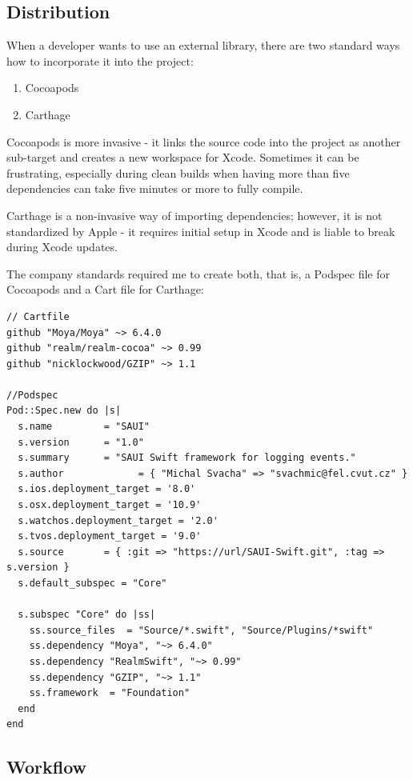 \subsection{Distribution}

When a developer wants to use an external library, there are two standard ways how to incorporate it into the project:

\begin{enumerate}
	\item Cocoapods
	\item Carthage
\end{enumerate}

Cocoapods is more invasive - it links the source code into the project as another sub-target and creates a new workspace for Xcode. Sometimes it can be frustrating, especially during clean builds when having more than five dependencies can take five minutes or more to fully compile.

Carthage is a non-invasive way of importing dependencies; however, it is not standardized by Apple - it requires initial setup in Xcode and is liable to break during Xcode updates.

\bigbreak

The company standards required me to create both, that is, a Podspec file for Cocoapods and a Cart file for Carthage:

\begin{lstlisting}
// Cartfile
github "Moya/Moya" ~> 6.4.0
github "realm/realm-cocoa" ~> 0.99
github "nicklockwood/GZIP" ~> 1.1

//Podspec
Pod::Spec.new do |s|
  s.name         = "SAUI"
  s.version      = "1.0"
  s.summary      = "SAUI Swift framework for logging events."
  s.author             = { "Michal Svacha" => "svachmic@fel.cvut.cz" }
  s.ios.deployment_target = '8.0'
  s.osx.deployment_target = '10.9'
  s.watchos.deployment_target = '2.0'
  s.tvos.deployment_target = '9.0'
  s.source       = { :git => "https://url/SAUI-Swift.git", :tag => s.version }
  s.default_subspec = "Core"

  s.subspec "Core" do |ss|
    ss.source_files  = "Source/*.swift", "Source/Plugins/*swift"
    ss.dependency "Moya", "~> 6.4.0"
    ss.dependency "RealmSwift", "~> 0.99"
    ss.dependency "GZIP", "~> 1.1"
    ss.framework  = "Foundation"
  end
end

\end{lstlisting}	

\newpage

\subsection{Workflow}

